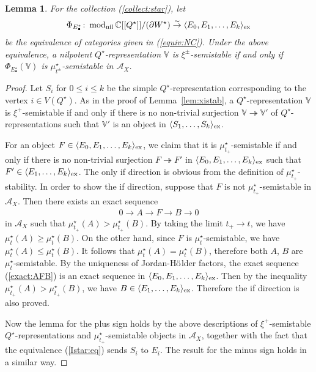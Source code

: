 \documentclass[11pt]{amsart}
\theoremstyle{plain}
\newtheorem{lem}[thm]{Lemma}
\theoremstyle{definition}
\theoremstyle{remark}
\newcommand{\aA}{\mathcal{A}}
\newcommand{\modu}{\mathop{\rm mod}\nolimits}
\begin{document}
\begin{lem}\label{lem:category2}
 For the collection (\ref{collect:star}), 
let
\begin{align*}
\Phi_{E^{\star}_{\bullet}} \colon 
\modu_{\rm{nil}}\mathbb{C}[[Q^{\star}]]/(\partial W^{\star}) \stackrel{\sim}{\to}
\langle E_0, E_1, \ldots, E_k \rangle_{\rm{ex}}
\end{align*}
be the equivalence of categories
given in (\ref{equiv:NC}).
Under the above equivalence, 
a nilpotent 
$Q^{\star}$-representation
$\mathbb{V}$ is $\xi^{\pm}$-semistable 
if and only if $\Phi_{E^{\star}_{\bullet}}(\mathbb{V})$ is 
$\mu_{t^{\pm}}^{\star}$-semistable in $\aA_X$. 
\end{lem}
\begin{proof}
Let $S_i$
for $0\le i\le k$ be the 
simple $Q^{\star}$-representation
corresponding to the vertex $i \in V(Q^{\star})$. 
As in the proof of Lemma~\ref{lem:xistab}, 
a $Q^{\star}$-representation
$\mathbb{V}$ is $\xi^{+}$-semistable 
if and only if there is 
no non-trivial surjection 
$\mathbb{V} \twoheadrightarrow \mathbb{V}'$
of $Q^{\star}$-representations 
such that $\mathbb{V}'$ is 
an object in $\langle S_1, \ldots, S_k \rangle_{\rm{ex}}$. 

For an object $F \in \langle E_0, E_1, \ldots, E_k \rangle_{\rm{ex}}$, 
we claim that it is $\mu_{t_{+}}^{\star}$-semistable 
if and only if there is no non-trivial surjection 
$F \twoheadrightarrow F'$ in 
$\langle E_0, E_1, \ldots, E_k \rangle_{\rm{ex}}$ 
such that $F' \in \langle E_1, \ldots, E_k \rangle_{\rm{ex}}$. 
The only if direction is obvious from the definition of 
$\mu_{t_{+}}^{\star}$-stability. 
In order to show the if direction, 
suppose that $F$ is not $\mu_{t_{+}}^{\star}$-semistable in $\aA_X$. 
Then there exists an exact sequence 
\begin{align}\label{exact:AFB}
0 \to A \to F \to B \to 0
\end{align}
in $\aA_X$
such that $\mu_{t_{+}}^{\star}(A)>\mu_{t_{+}}^{\star}(B)$. 
By taking the limit $t_+ \to t$, we 
have $\mu_t^{\star}(A) \ge \mu_t^{\star}(B)$. 
On the other hand, since 
$F$ is $\mu_{t}^{\star}$-semistable, we have 
$\mu_{t}^{\star}(A) \le \mu_t^{\star}(B)$. 
It follows that $\mu_t^{\star}(A)=\mu_t^{\star}(B)$, 
therefore both $A$, $B$ are $\mu_t^{\star}$-semistable. 
By the uniqueness of Jordan-H$\ddot{\rm{o}}$lder factors, 
the exact sequence (\ref{exact:AFB}) is an exact sequence 
in $\langle E_0, E_1, \ldots, E_k \rangle_{\rm{ex}}$. 
Then by the inequality $\mu_{t_{+}}^{\star}(A)>\mu_{t_{+}}^{\star}(B)$, 
we have $B \in \langle E_1, \ldots, E_k \rangle_{\rm{ex}}$. 
Therefore the if direction is also proved. 

Now the lemma for the plus sign holds by the above descriptions of 
$\xi^{+}$-semistable
$Q^{\star}$-representations and $\mu_{t_{+}}^{\star}$-semistable 
objects
in $\aA_X$,  
together with the 
fact that the equivalence (\ref{Istar:eq}) sends $S_i$ to $E_i$. 
The result for the minus sign holds in a similar way. 
\end{proof}
\end{document}
